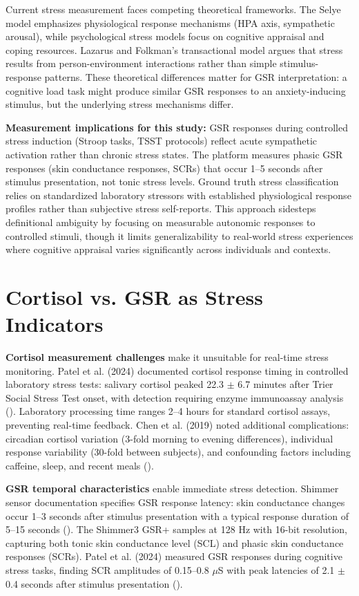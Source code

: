 Current stress measurement faces competing theoretical frameworks. The Selye model emphasizes physiological response mechanisms (HPA axis, sympathetic arousal), while psychological stress models focus on cognitive appraisal and coping resources. Lazarus and Folkman's transactional model argues that stress results from person-environment interactions rather than simple stimulus-response patterns. These theoretical differences matter for GSR interpretation: a cognitive load task might produce similar GSR responses to an anxiety-inducing stimulus, but the underlying stress mechanisms differ.

\textbf{Measurement implications for this study:} GSR responses during controlled stress induction (Stroop tasks, TSST protocols) reflect acute sympathetic activation rather than chronic stress states. The platform measures phasic GSR responses (skin conductance responses, SCRs) that occur 1--5 seconds after stimulus presentation, not tonic stress levels. Ground truth stress classification relies on standardized laboratory stressors with established physiological response profiles rather than subjective stress self-reports. This approach sidesteps definitional ambiguity by focusing on measurable autonomic responses to controlled stimuli, though it limits generalizability to real-world stress experiences where cognitive appraisal varies significantly across individuals and contexts.


\section{Cortisol vs. GSR as Stress Indicators}
\textbf{Cortisol measurement challenges} make it unsuitable for real-time stress monitoring. Patel et al. (2024) documented cortisol response timing in controlled laboratory stress tests: salivary cortisol peaked 22.3 $\pm$ 6.7 minutes after Trier Social Stress Test onset, with detection requiring enzyme immunoassay analysis (\citep{ref7}). Laboratory processing time ranges 2--4 hours for standard cortisol assays, preventing real-time feedback. Chen et al. (2019) noted additional complications: circadian cortisol variation (3-fold morning to evening differences), individual response variability (30-fold between subjects), and confounding factors including caffeine, sleep, and recent meals (\citep{ref4}).

\textbf{GSR temporal characteristics} enable immediate stress detection. Shimmer sensor documentation specifies GSR response latency: skin conductance changes occur 1--3 seconds after stimulus presentation with a typical response duration of 5--15 seconds (\citep{ref8}). The Shimmer3 GSR+ samples at 128 Hz with 16-bit resolution, capturing both tonic skin conductance level (SCL) and phasic skin conductance responses (SCRs). Patel et al. (2024) measured GSR responses during cognitive stress tasks, finding SCR amplitudes of 0.15--0.8 $\mu$S with peak latencies of 2.1 $\pm$ 0.4 seconds after stimulus presentation (\citep{ref7}).

